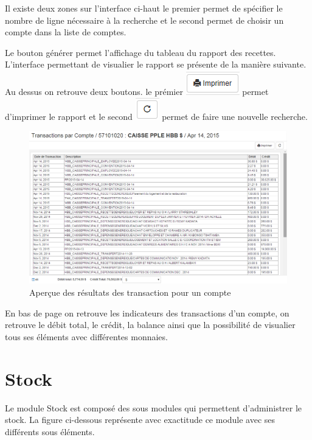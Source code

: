 \documentclass[12pt,a4paper]{report}
\begin{document}
Il existe deux zones sur l'interface ci-haut le premier permet de spécifier le nombre de ligne nécessaire à la recherche et le second permet de choisir un compte dans la liste de comptes.

Le bouton générer permet l'affichage du tableau du rapport des  recettes. L'interface permettant de visualier le rapport se présente de la manière suivante. Au dessus on retrouve deux boutons. le prémier 
\includegraphics[scale=0.7]{pic/Print.png} permet d'imprimer le rapport et le second \includegraphics[scale=0.7]{pic/refresh.png} permet de faire une nouvelle recherche.

\begin{figure}[h]
\begin{center}
\includegraphics[width=12cm]{pic/TraByAccount.png}
\end{center}
\caption{Aperçue des résultats des transaction pour un compte}
\label{Aperçue des résultats des transaction pour un compte}
\end{figure}


En bas de page on retrouve les indicateurs des transactions d'un compte, on retrouve le débit total, le crédit, la balance ainsi que la possibilité de visualier tous ses éléments avec différentes monnaies. 


\newpage
\chapter{Stock}        
Le module Stock est composé des sous modules qui permettent d'administrer le stock. La figure ci-dessous représente avec exactitude ce module avec ses différents sous éléments.
\end{document}
